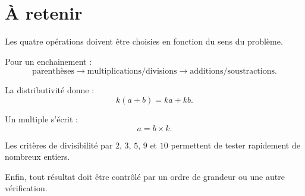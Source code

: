\section{À retenir}

\begin{aretenir}
Les quatre opérations doivent être choisies en fonction du sens du problème.

Pour un enchainement :
\[
\boxed{\text{parenthèses} \rightarrow \text{multiplications/divisions} \rightarrow \text{additions/soustractions}}.
\]

La distributivité donne :
\[
\boxed{k(a+b)=ka+kb}.
\]

Un multiple s'écrit :
\[
a=b\times k.
\]

Les critères de divisibilité par $2$, $3$, $5$, $9$ et $10$ permettent de tester rapidement de nombreux entiers.

Enfin, tout résultat doit être contrôlé par un ordre de grandeur ou une autre vérification.
\end{aretenir}
